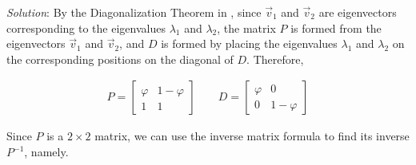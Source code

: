 \documentclass{article}
\begin{document}
\begin{enumerate}
        \emph{Solution}: By the Diagonalization Theorem in \textcite[Theorem~5.5, p.~291]{LayEtAl2020LinearAlgebraAndItsApplications}, since $\vec{v}_1$ and $\vec{v}_2$ are eigenvectors corresponding to the eigenvalues $\lambda_1$ and $\lambda_2$, the matrix $P$ is formed from the eigenvectors $\vec{v}_1$ and $\vec{v}_2$, and $D$ is formed by placing the eigenvalues $\lambda_1$ and $\lambda_2$ on the corresponding positions on the diagonal of $D$. Therefore,

        \begin{align*}
          P = \begin{bmatrix}
                \varphi & 1-\varphi \\
                1       & 1
              \end{bmatrix} \qquad D = \begin{bmatrix}
                                         \varphi & 0           \\
                                         0       & 1 - \varphi
                                       \end{bmatrix}
        \end{align*}

        Since $P$ is a $2 \times 2$ matrix, we can use the inverse matrix formula to find its inverse $P^{-1}$, namely.


\end{enumerate}
\end{document}
